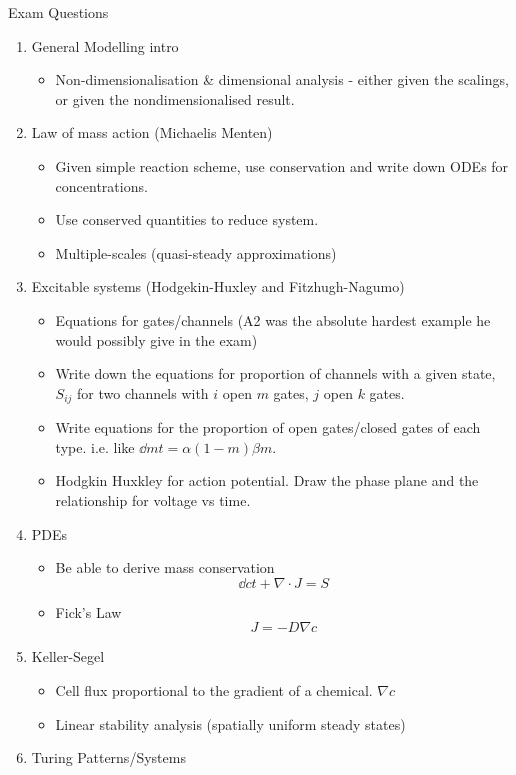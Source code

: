 \documentclass{X:/Documents/Coding/Latex/myassignment}
\begin{document}
\clearpage
Exam Questions
\begin{enumerate}
	\item General Modelling intro
	\begin{itemize}
		\item Non-dimensionalisation \& dimensional analysis - either given the scalings, or given the nondimensionalised result.
	\end{itemize}
	\item Law of mass action (Michaelis Menten)
	\begin{itemize}
		\item Given simple reaction scheme, use conservation and write down ODEs for concentrations.
		\item Use conserved quantities to reduce system. 
		\item Multiple-scales (quasi-steady approximations)
	\end{itemize}
	\item Excitable systems (Hodgekin-Huxley and Fitzhugh-Nagumo)
	\begin{itemize}
		\item Equations for gates/channels (A2 was the absolute hardest example he would possibly give in the exam)
		\item Write down the equations for proportion of channels with a given state, $S_{ij}$ for two channels with $i$ open $m$ gates, $j$ open $k$ gates.
		\item Write equations for the proportion of open gates/closed gates of each type. i.e. like $\dd mt = \alpha(1-m) \beta m$.
		\item Hodgkin Huxkley for action potential. Draw the phase plane and the relationship for voltage vs time.
	\end{itemize}
	\item PDEs
	\begin{itemize}
		\item Be able to derive mass conservation
		\[\dd ct + \nabla \cdot J = S\] 
		\item Fick's Law
		\[J = -D \nabla c\]
	\end{itemize}
	\item Keller-Segel
	\begin{itemize}
		\item Cell flux proportional to the gradient of a chemical. $\nabla c$
		\item Linear stability analysis (spatially uniform steady states)
	\end{itemize}
	\item Turing Patterns/Systems

\end{enumerate}
\end{document}
